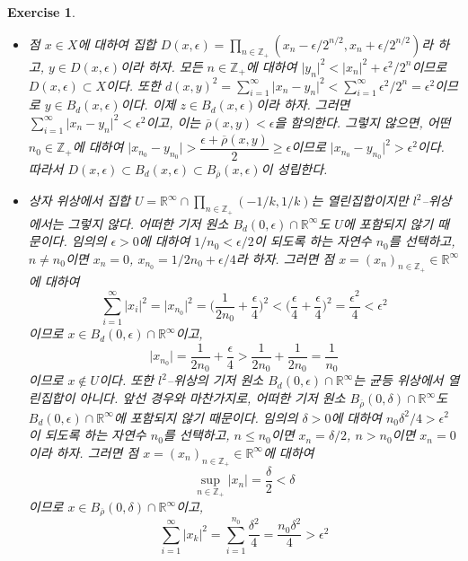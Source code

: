 \documentclass{article}
\newtheorem{exercise}{Exercise}[section]
\newcommand{\R}{\mathbb{R}}
\newcommand{\Z}{\mathbb{Z}}
\begin{document}
\begin{exercise}
    \phantom{}
    \begin{itemize}
        \item[(a)] 점 $x\in X$에 대하여 집합 $D(x,\epsilon)=\prod_{n\in\Z_+}(x_n-\epsilon/2^{n/2},x_n+\epsilon/2^{n/2})$라 하고, $y\in D(x,\epsilon)$이라 하자. 모든 $n\in\Z_+$에 대하여 $\vert y_n\vert^2<\vert x_n\vert^2+\epsilon^2/2^n$이므로 $D(x,\epsilon)\subset X$이다. 또한 $d(x,y)^2=\sum_{i=1}^\infty\vert x_n-y_n\vert^2<\sum_{i=1}^\infty\epsilon^2/2^n=\epsilon^2$이므로 $y\in B_d(x,\epsilon)$이다. 이제 $z\in B_d(x,\epsilon)$이라 하자. 그러면 $\sum_{i=1}^\infty\vert x_n-y_n\vert^2<\epsilon^2$이고, 이는 $\overline{\rho}(x,y)<\epsilon$을 함의한다. 그렇지 않으면, 어떤 $n_0\in\Z_+$에 대하여 $\vert x_{n_0}-y_{n_0}\vert>\dfrac{\epsilon+\overline{\rho}(x,y)}{2}\geq\epsilon$이므로 $\vert x_{n_0}-y_{n_0}\vert^2>\epsilon^2$이다. 따라서 $D(x,\epsilon)\subset B_d(x,\epsilon)\subset B_{\overline{\rho}}(x,\epsilon)$이 성립한다.
        \item[(b)] 상자 위상에서 집합 $U=\R^\infty\cap\prod_{n\in\Z_+}(-1/k,1/k)$는 열린집합이지만 $l^2$--위상에서는 그렇지 않다. 어떠한 기저 원소 $B_d(0,\epsilon)\cap\R^\infty$도 $U$에 포함되지 않기 때문이다. 임의의 $\epsilon>0$에 대하여 $1/n_0<\epsilon/2$이 되도록 하는 자연수 $n_0$를 선택하고, $n\ne n_0$이면 $x_n=0$, $x_{n_0}=1/2n_0+\epsilon /4$라 하자. 그러면 점 $x=(x_n)_{n\in\Z_+}\in\R^\infty$에 대하여
            \[
              \sum_{i=1}^\infty\vert x_i\vert^2=\vert x_{n_0}\vert^2=\biggl(\frac{1}{2n_0}+\frac{\epsilon}{4}\biggr)^2<\biggl(\frac{\epsilon}{4}+\frac{\epsilon}{4}\biggr)^2=\dfrac{\epsilon^2}{4}<\epsilon^2
            \]
            이므로 $x\in B_d(0,\epsilon)\cap\R^\infty$이고,
            \[
                \vert x_{n_0}\vert=\frac{1}{2n_0}+\frac{\epsilon}{4}>\frac{1}{2n_0}+\frac{1}{2n_0}=\frac{1}{n_0}
            \]
            이므로 $x\notin U$이다. 또한 $l^2$--위상의 기저 원소 $B_d(0,\epsilon)\cap\R^\infty$는 균등 위상에서 열린집합이 아니다. 앞선 경우와 마찬가지로, 어떠한 기저 원소 $B_{\overline{\rho}}(0,\delta)\cap\R^\infty$도 $B_d(0,\epsilon)\cap\R^\infty$에 포함되지 않기 때문이다. 임의의 $\delta>0$에 대하여 $n_0\delta^2/4>\epsilon^2$이 되도록 하는 자연수 $n_0$를 선택하고, $n\leq n_0$이면 $x_n=\delta/2$, $n>n_0$이면 $x_n=0$이라 하자. 그러면 점 $x=(x_n)_{n\in\Z_+}\in\R^\infty$에 대하여
                \[
                    \sup_{n\in\Z_+}\vert x_n\vert=\frac{\delta}{2}<\delta
                \]
                이므로 $x\in B_{\overline{\rho}}(0,\delta)\cap\R^\infty$이고,
                \[
                    \sum_{i=1}^\infty\vert x_k\vert^2=\sum_{i=1}^{n_0}\frac{\delta^2}{4}=\frac{n_0\delta^2}{4}>\epsilon^2
\]
\end{itemize}
\end{exercise}
\end{document}
